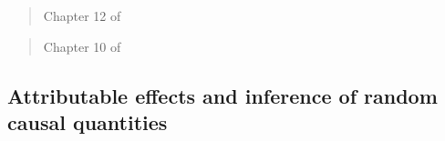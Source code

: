 \documentclass[12pt]{article}
\begin{document}
\begin{verse}  \end{verse}

\begin{verse}  \end{verse}

\begin{verse}  \end{verse}

\begin{verse} Chapter 12 of  \end{verse}

\begin{verse}  \end{verse}

\begin{verse} Chapter 10 of  \end{verse}

\begin{verse}  \end{verse}

\begin{verse}  \end{verse}

\subsection{Attributable effects and inference of random causal quantities}

\begin{verse}  \end{verse}

\begin{verse}  \end{verse}

\begin{verse}  \end{verse}

\begin{verse}  \end{verse}

\begin{verse}  \end{verse}

\begin{verse}  \end{verse}
\end{document}
